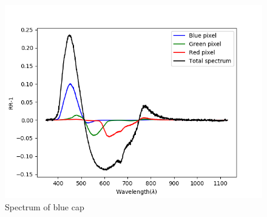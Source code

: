 \begin{figure}[h]
    \centering
    \includegraphics[width=1\textwidth]{Plots/blue_cap_rr_minus_one_with_qe.png}    
    \caption{Spectrum of blue cap}
    \label{fig:blue_cap_spectrum}
\end{figure}